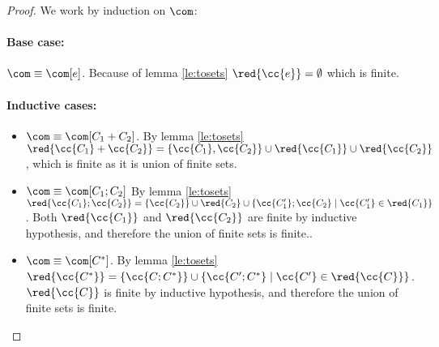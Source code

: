 \begin{proof}
  We work by induction on \(\com\):

  \noindent
  \paragraph*{Base case:\\}
  
  \(\com \equiv \com[e]\). Because of lemma \ref{le:tosets}
  \(\red{\cc{e}} = \emptyset\) which is finite.

  \noindent
  \paragraph*{Inductive cases:\\}
  \begin{itemize}
  \item \(\com \equiv \com[C_1 + C_2]\). By lemma \ref{le:tosets}
    \(\red{\cc{C_1} + \cc{C_2}} = \{\cc{C_1}, \cc{C_2}\} \cup
    \red{\cc{C_1}} \cup \red{\cc{C_2}}\), which is finite as it is
    union of finite sets.
  \item \(\com \equiv \com[C_1;C_2]\) By lemma \ref{le:tosets}
    \(\red{\cc{C_1}; \cc{C_2}} =
    \{\cc{C_2}\}\cup\red{C_2}\cup\{\cc{C_1'};\cc{C_2} \mid
    \cc{C_1'}\in\red{C_1}\}\). Both \(\red{\cc{C_1}}\) and
    \(\red{\cc{C_2}}\) are finite by inductive hypothesis, and
    therefore the union of finite sets is finite..
  \item \(\com \equiv \com[C^*]\). By lemma \ref{le:tosets}
    \(\red{\cc{C^*}} = \{\cc{C;C^*}\} \cup \{\cc{C';C^*} \mid
    \cc{C'}\in\red{\cc{C}}\}\). \(\red{\cc{C}}\) is finite by
    inductive hypothesis, and therefore the union of finite sets is
    finite.
  \end{itemize}
  
\end{proof}
